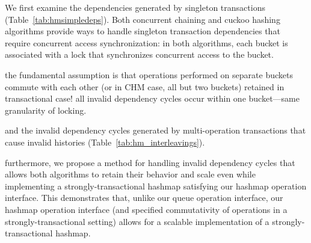 We first examine the dependencies generated by singleton transactions (Table~\ref{tab:hmsimpledeps}). Both concurrent chaining and cuckoo hashing algorithms provide ways to handle singleton transaction dependencies that require concurrent access synchronization: in both algorithms, each bucket is associated with a lock that synchronizes concurrent access to the bucket.

the fundamental assumption is that operations performed on separate buckets commute with each other
(or in CHM case, all but two buckets)
retained in transactional case! all invalid dependency cycles occur within one bucket---same granularity of locking.

 and the invalid dependency cycles generated by multi-operation transactions that cause invalid histories (Table~\ref{tab:hm_interleavings}).

furthermore, we propose a method for handling invalid dependency cycles that allows both algorithms to retain their behavior and scale even while implementing a strongly-transactional hashmap satisfying our hashmap operation interface. This demonstrates that, unlike our queue operation interface, our hashmap operation interface (and specified commutativity of operations in a strongly-transactional setting) allows for a scalable implementation of a strongly-transactional hashmap.

